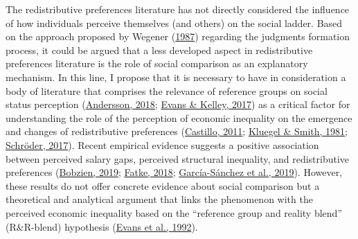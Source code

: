 \documentclass[
  12pt,
]{book}
\begin{document}
The redistributive preferences literature has not directly considered the influence of how individuals perceive themselves (and others) on the social ladder. Based on the approach proposed by Wegener (\protect\hyperlink{ref-Wegener1987}{1987}) regarding the judgments formation process, it could be argued that a less developed aspect in redistributive preferences literature is the role of social comparison as an explanatory mechanism. In this line, I propose that it is necessary to have in consideration a body of literature that comprises the relevance of reference groups on social status perception (\protect\hyperlink{ref-Andersson2018a}{Andersson, 2018}; \protect\hyperlink{ref-Evans2017}{Evans \& Kelley, 2017}) as a critical factor for understanding the role of the perception of economic inequality on the emergence and changes of redistributive preferences (\protect\hyperlink{ref-Castillo2011}{Castillo, 2011}; \protect\hyperlink{ref-Smith1981}{Kluegel \& Smith, 1981}; \protect\hyperlink{ref-Schroder2017_soc_jus}{Schröder, 2017}). Recent empirical evidence suggests a positive association between perceived salary gaps, perceived structural inequality, and redistributive preferences (\protect\hyperlink{ref-Bobzien2019}{Bobzien, 2019}; \protect\hyperlink{ref-Fatke2018}{Fatke, 2018}; \protect\hyperlink{ref-Garcia-Sanchez19}{García-Sánchez et al., 2019}). However, these results do not offer concrete evidence about social comparison but a theoretical and analytical argument that links the phenomenon with the perceived economic inequality based on the ``reference group and reality blend'' (R\&R-blend) hypothesis (\protect\hyperlink{ref-Evans1992}{Evans et al., 1992}).
\end{document}
